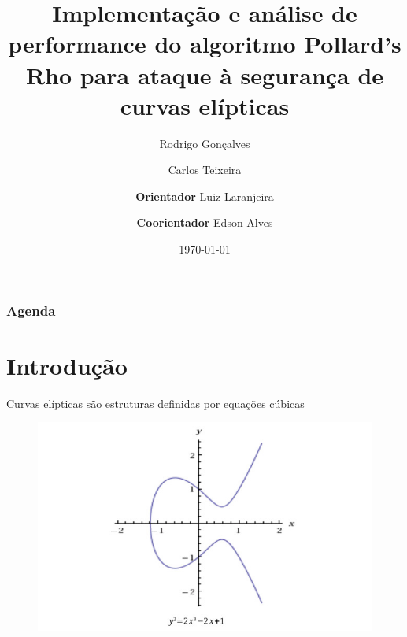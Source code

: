 \documentclass{beamer}
\title[TCC]{Implementação e análise de performance do algoritmo Pollard's Rho para ataque à segurança de curvas elípticas} %
\author[Rodrigo Gonçalves \and Carlos Teixeira]{Rodrigo Gonçalves \and Carlos Teixeira\\ \and \textbf{Orientador} Luiz Laranjeira\\ \and \textbf{Coorientador} Edson Alves}
\institute[UnB-FGA] %
{
Universidade de Brasília - Campus Gama - FGA\\ %
\medskip
}
\date{\today} %
\begin{document}
\begin{frame}
\titlepage %
\end{frame}

\begin{frame}
\frametitle{Agenda} %
\tableofcontents %


\end{frame}

%
%

\section{Introdução}
\begin{frame}

Curvas elípticas são estruturas definidas por equações cúbicas

\begin{figure}
\includegraphics[scale = 0.3]{curva_eliptica}
\end{figure}

\end{frame}
\end{document}
